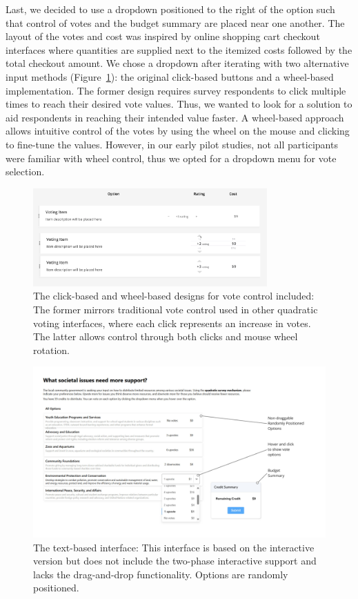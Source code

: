 Last, we decided to use a dropdown positioned to the right of the option such that control of votes and the budget summary are placed near one another. The layout of the votes and cost was inspired by online shopping cart checkout interfaces where quantities are supplied next to the itemized costs followed by the total checkout amount. We chose a dropdown after iterating with two alternative input methods (Figure~\ref{fig:btn_design}): the original click-based buttons and a wheel-based implementation. The former design requires survey respondents to click multiple times to reach their desired vote values. Thus, we wanted to look for a solution to aid respondents in reaching their intended value faster. A wheel-based approach allows intuitive control of the votes by using the wheel on the mouse and clicking to fine-tune the values. However, in our early pilot studies, not all participants were familiar with wheel control, thus we opted for a dropdown menu for vote selection.

\begin{figure}[h]
    \centering
    \includegraphics[width=0.8\textwidth]{content/image/prototypes/btn_design.png}
    \caption{The click-based and wheel-based designs for vote control included: The former mirrors traditional vote control used in other quadratic voting interfaces, where each click represents an increase in votes. The latter allows control through both clicks and mouse wheel rotation.}
    \label{fig:btn_design}
\end{figure}

\begin{figure}[h]
    \centering
    \includegraphics[width=\textwidth]{content/image/detailed_text.pdf}
    \caption{The text-based interface: This interface is based on the interactive version but does not include the two-phase interactive support and lacks the drag-and-drop functionality. Options are randomly positioned.}
    \label{fig:textInterface}
\end{figure}

